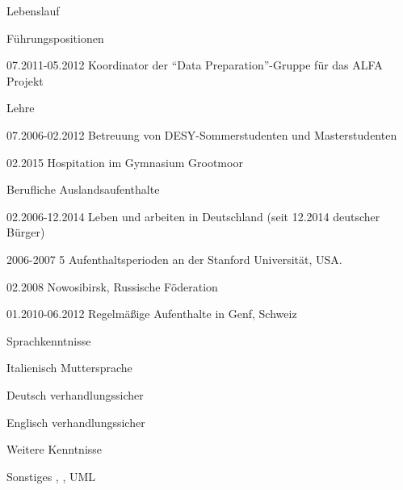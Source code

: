 \documentclass[11pt,a4paper]{scrartcl}
\newcommand{\versal}[1]{\textsf{\textsmaller{\MakeUppercase{\caps{#1}}}}\xspace}
\newcommand*{\ac}[1]{\versal{#1}}
\begin{document}
\begin{cv}{Lebenslauf}
\begin{cvlist}{F\"uhrungspositionen}
\item [07.2011-05.2012] Koordinator der "`Data Preparation"'-Gruppe
f\"ur das ALFA Projekt
\end{cvlist}

\begin{cvlist}{Lehre}
\item [07.2006-02.2012] Betreuung von DESY-Sommerstudenten und
Masterstudenten
\item [02.2015] Hospitation im Gymnasium Grootmoor
\end{cvlist}

\begin{cvlist}{Berufliche Auslandsaufenthalte}
\item [02.2006-12.2014] Leben und arbeiten in Deutschland (seit 12.2014
deutscher B{\"u}rger)
\item [2006-2007] 5 Aufenthaltsperioden an der Stanford Universit\"at, USA.
\item [02.2008] Nowosibirsk, Russische F\"oderation
\item [01.2010-06.2012] Regelm\"a{\ss}ige Aufenthalte in Genf, Schweiz
\end{cvlist}

\begin{cvlist}{Sprachkenntnisse}
\item [Italienisch] Muttersprache
\item [Deutsch] verhandlungssicher
\item [Englisch] verhandlungssicher
\end{cvlist}

\begin{cvlist}{Weitere \ac{EDV} Kenntnisse}
\item[Sonstiges] \ac{MS OFFICE}, \ac{\LaTeX}, UML
\end{cvlist}



\end{cv}
\end{document}
